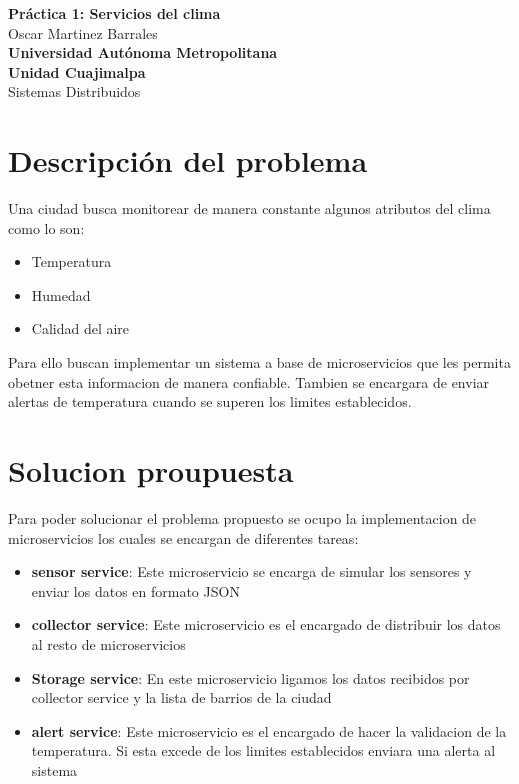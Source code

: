 \documentclass[12pt]{article}
\begin{document}
\begin{titlepage}
    \centering
    \vspace*{3cm}
    \Huge{\textbf{Práctica 1: Servicios del clima}}\\[0.5cm]
    \Large{Oscar Martinez Barrales}\\[0.5cm]
    \Large{\textbf{Universidad Autónoma Metropolitana}}\\[0.5cm]
    \Large{\textbf{Unidad Cuajimalpa}}\\[0.5cm]
    \Large{Sistemas Distribuidos} 
\end{titlepage}
\section*{Descripción del problema}

Una ciudad busca monitorear de manera constante algunos atributos del clima como lo son:
\begin{itemize}
    \item Temperatura
    \item Humedad
    \item Calidad del aire
\end{itemize}
Para ello buscan implementar un sistema a base de microservicios que les permita obetner esta informacion
de manera confiable. Tambien se encargara de enviar alertas de temperatura cuando 
se superen los limites establecidos.
\section*{Solucion proupuesta}
Para poder solucionar el problema propuesto se ocupo la implementacion de microservicios 
los cuales se encargan de diferentes tareas:
\begin{itemize}
    \item \textbf{sensor service}: Este microservicio se encarga de simular los sensores y enviar los datos en formato JSON
    \item \textbf{collector service}: Este microservicio es el encargado de distribuir los datos al resto de microservicios
    \item \textbf{Storage service}: En este microservicio ligamos los datos recibidos por collector service y la lista de barrios de la ciudad
    \item \textbf{alert service}: Este microservicio es el encargado de hacer la validacion de la temperatura. Si esta excede de los limites establecidos enviara una alerta al sistema
\end{itemize}
\end{document}
